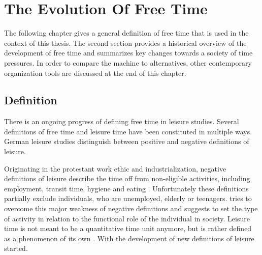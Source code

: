 \documentclass[12pt,numbers=noenddot,parskip,bibliography=totocnumbered,listof=totocnumbered]{scrreprt}
\begin{document}

\chapter{The Evolution Of Free Time}

The following chapter gives a general definition of free time that is used in the context of this thesis. The second section provides a historical overview of the development of free time and summarizes key changes towards a society of time pressures. In order to compare the machine to alternatives, other contemporary organization tools are discussed at the end of this chapter.

\section{Definition}

There is an ongoing progress of defining free time in leisure studies. Several definitions of free time and leisure time have been constituted in multiple ways. German leisure studies distinguish between positive and negative definitions of leisure. 

Originating in the protestant work ethic \citep[p.27]{weber2006} and industrialization, negative definitions of leisure describe the time off from non-eligible activities, including employment, transit time, hygiene and eating \citep[p.137]{prahl2002}. Unfortunately these definitions partially exclude individuals, who are unemployed, elderly or teenagers. \citeauthor{scheuch1972} tries to overcome this major weakness of negative definitions and suggests to set the type of activity in relation to the functional role of the individual in society. Leisure time is not meant to be a quantitative time unit anymore, but is rather defined as a phenomenon of its own \citep[p.31]{scheuch1972}. With \citeauthor{scheuch1972} the development of new definitions of leisure started.
\end{document}
